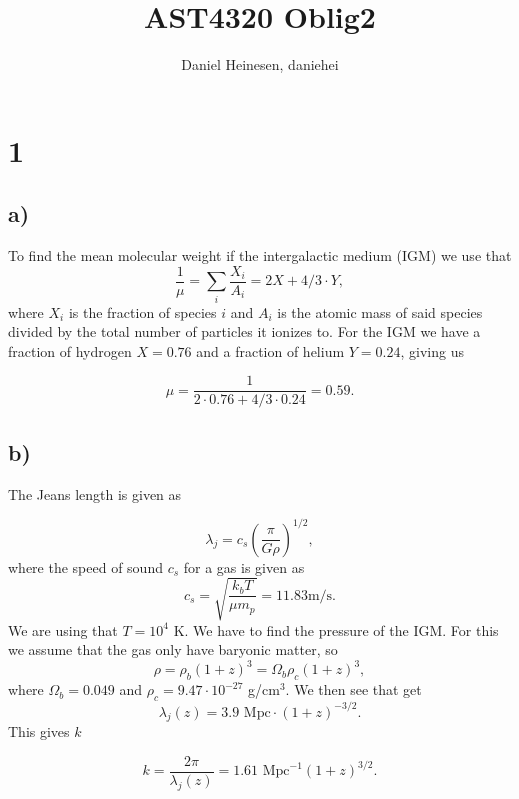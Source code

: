 \documentclass[a4paper,norsk, 10pt]{article}
\title{AST4320 Oblig2}
\author{Daniel Heinesen, daniehei}
\begin{document}
\maketitle

\section{1}
\subsection{a)}

To find the mean molecular weight if the intergalactic medium (IGM) we use that
\begin{equation}
\dfrac{1}{\mu} = \sum_i \dfrac{X_i}{A_i} = 2X + 4/3\cdot Y,
\end{equation}
where $X_i$ is the fraction of species $i$ and $A_i$ is the atomic mass of said species divided by the total number of particles it ionizes to. For the IGM we have a fraction of hydrogen $X = 0.76$ and a fraction of helium $Y = 0.24$, giving us

\begin{equation}
\mu = \dfrac{1}{2\cdot0.76 + 4/3\cdot0.24} = 0.59.
\end{equation}

\subsection{b)}
The Jeans length is given as 

\begin{equation}
\lambda_j = c_s\left(\dfrac{\pi}{G\rho}\right)^{1/2},
\end{equation}
where the speed of sound $c_s$ for a gas is given as
\begin{equation}
c_s = \sqrt{\dfrac{k_b T}{\mu m_p}} = 11.83 \text{m/s}.
\end{equation}
We are using that $T=10^4$ K. We have to find the pressure of the IGM. For this we assume that the gas only have baryonic matter, so
\begin{equation}
\rho = \rho_b(1+z)^3 = \Omega_b \rho_c (1+z)^3,
\end{equation}
where $\Omega_b = 0.049$ and $\rho_c = 9.47\cdot 10^{-27}$ g/cm$^{3}$. 
We then see that get
\begin{equation}
\lambda_j(z) = 3.9\text{ Mpc}\cdot(1+z)^{-3/2}.
\end{equation}
This gives $k$

\begin{equation}
k = \dfrac{2\pi}{\lambda_j(z)} = 1.61 \text{ Mpc}^{-1} (1+z)^{3/2}.
\end{equation}
\end{document}
